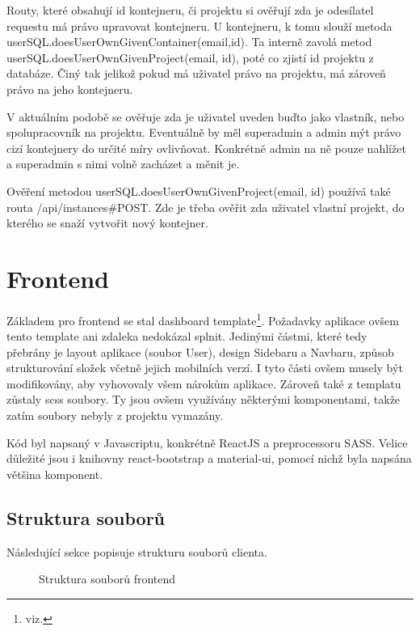 \documentclass[a4paper,oneside,12pt]{report}
\begin{document}
Routy, které obsahují id kontejneru, či projektu si ověřují zda je odesílatel requestu má právo upravovat kontejneru.
U kontejneru, k tomu slouží metoda userSQL.doesUser\linebreak OwnGivenContainer(email,id).
Ta interně zavolá metod userSQL.doesUserOwnGiven\linebreak Project(email, id), poté co zjistí id projektu z databáze.
Činý tak jelikož pokud má uživatel právo na projektu, má zároveň právo na jeho kontejneru.

V aktuálním podobě se ověřuje zda je uživatel uveden buďto jako vlastník, nebo spolupracovník na projektu.
Eventuálně by měl superadmin a admin mýt právo cizí kontejnery do určité míry ovlivňovat.
Konkrétně admin na ně pouze nahlížet a superadmin s nimi volně zacházet a měnit je.

Ověření metodou userSQL.doesUserOwnGivenProject(email, id) používá také routa /api/instances\#POST.
Zde je třeba ověřit zda uživatel vlastní projekt, do kterého se snaží vytvořit nový kontejner.

\chapter{Frontend}

Základem pro frontend se stal dashboard template\footnote{viz. }.
 Požadavky aplikace ovšem tento template ani zdaleka nedokázal splnit. Jedinými částmi, které tedy přebrány je layout aplikace (soubor User), design Sidebaru a Navbaru, způsob strukturování složek včetně jejich mobilních verzí.
 I tyto části ovšem musely být modifikovány, aby vyhovovaly všem nárokům aplikace.
 Zároveň také z templatu zůstaly scss soubory.
 Ty jsou ovšem využívány některými komponentami, takže zatím soubory nebyly z projektu vymazány.

 Kód byl napsaný v Javascriptu, konkrétně ReactJS a preprocessoru SASS. Velice důležité jsou i knihovny react-bootstrap a material-ui, pomocí nichž byla napsána většina komponent.

\section{Struktura souborů}

Následující sekce popisuje strukturu souborů clienta.

\begin{figure}[h]
	\caption[Struktura souborů frontendu, vlastní tvorba]{Struktura souborů frontend}
	\label{fig:frontendStructure}
\end{figure}
\end{document}
